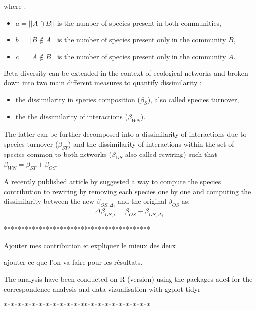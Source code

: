 where :
\begin{itemize}
    \item $a = ||A \cap B||$ is the number of species present in both communities,
    \item $b = ||B \notin A||$ is the number of species present only in the community $B$,
    \item $c = ||A \notin B||$ is the number of species present only in the community $A$.
\end{itemize}

Beta diversity can be extended in the context of ecological networks and broken down into two main different measures to quantify dissimilarity \cite{poisot_dissimilarity_2012}:
\begin{itemize}
    \item the dissimilarity in species composition ($\beta_S$), also called species turnover,
    \item the the dissimilarity of interactions ($\beta_{WN}$).
\end{itemize}
 The latter can be further decomposed into a dissimilarity of interactions due to species turnover ($\beta_{ST}$) and the dissimilarity of interactions within the set of species common to both networks ($\beta_{OS}$ also called rewiring) such that $\beta_{WN} = \beta_{ST} + \beta_{OS}$. 

A recently published article by \cite{toju_interaction_2024} suggested a way to compute the species contribution to rewiring by removing each species one by one and computing the dissimilarity between the new $\beta_{OS,\Delta_i}$ and the original $\beta_{OS}$ as:
$$
    \Delta\beta_{OS,i} = \beta_{OS} - \beta_{OS,\Delta_i}
$$

******************************************

Ajouter mes contribution et expliquer le mieux des deux

ajouter ce que l'on va faire pour les résultats.


The analysis have been conducted on R (version) using the packages ade4 for the correspondence analysis and data vizualisation with ggplot tidyr


******************************************